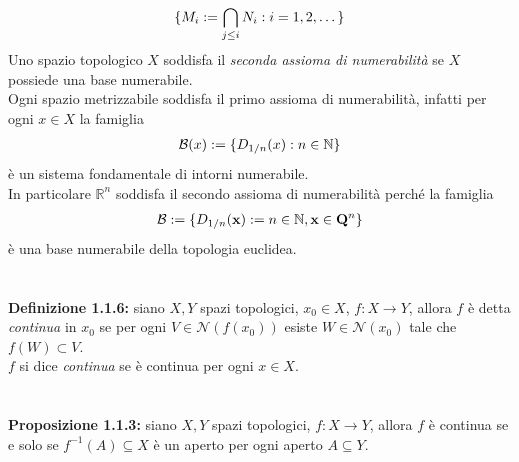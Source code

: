 \documentclass{article}
\begin{document}
\begin{gather}
    \{ M_i := \bigcap_{j \leq i} N_i : i = 1, 2, \dots \} \notag
\end{gather}
Uno spazio topologico $X$ soddisfa il \textit{seconda assioma di numerabilità} se $X$ possiede una base numerabile. \\
Ogni spazio metrizzabile soddisfa il primo assioma di numerabilità, infatti per ogni $x \in X$ la famiglia
\begin{gather}
    \mathcal{B}(x) := \{ D_{1/n}(x) : n \in \mathbb{N} \} \notag
\end{gather}
è un sistema fondamentale di intorni numerabile. \\
In particolare $\mathbb{R}^n$ soddisfa il secondo assioma di numerabilità perché la famiglia
\begin{gather}
    \mathcal{B} := \{ D_{1/n}(\mathbf{x}) := n \in \mathbb{N}, \mathbf{x} \in \mathbf{Q}^n \} \notag
\end{gather}
è una base numerabile della topologia euclidea. \\ \\ \\
\textbf{Definizione 1.1.6:} siano $X, Y$ spazi topologici, $x_0 \in X$, $f : X \longrightarrow Y$, allora $f$ è detta \textit{continua} in $x_0$ se per ogni $V \in \mathcal{N}(f(x_0))$ esiste $W \in \mathcal{N}(x_0)$ tale che $f(W) \subset V$. \\
$f$ si dice \textit{continua} se è continua per ogni $x \in X$. \\ \\ \\
\textbf{Proposizione 1.1.3:} siano $X, Y$ spazi topologici, $f : X \longrightarrow Y$, allora $f$ è continua se e solo se $f^{-1}(A) \subseteq X$ è un aperto per ogni aperto $A \subseteq Y$. \\
\end{document}
